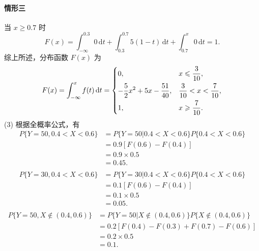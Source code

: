 \begin{solution}
    \paragraph{情形三} 当 $x \geqslant 0.7$ 时
    $$
        F(x) = \int_{-\infty}^{0.3}0\,\mathrm{d}t + \int_{0.3}^{0.7}5(1-t)\,\mathrm{d}t + \int_{0.7}^{x} 0\,\mathrm{d}t = 1.
    $$
    综上所述，分布函数 $F(x)$ 为
    $$
        F(x) = \int_{-\infty}^x f(t) \,\mathrm{d}t
        = \begin{dcases}
            0,                                    & x \leqslant \frac{3}{10},    \\
            -\frac{5}{2}x^2 + 5x - \frac{51}{40}, & \frac{3}{10}<x<\frac{7}{10}, \\
            1,                                    & x \geqslant \frac{7}{10}.
        \end{dcases}
    $$
    (3) 根据全概率公式，有
    $$
        \begin{aligned}
            P\{Y=50 , 0.4<X<0.6\}
             & = P\{Y=50 | 0.4<X<0.6\}P\{0.4<X<0.6\} \\
             & = 0.9 [F(0.6)-F(0.4)]                 \\
             & = 0.9 \times 0.5                      \\
             & = 0.45.                               \\
        \end{aligned}
    $$
    $$
        \begin{aligned}
            P\{Y=30 , 0.4<X<0.6\}
             & = P\{Y=30 | 0.4<X<0.6\}P\{0.4<X<0.6\} \\
             & = 0.1 [F(0.6)-F(0.4)]                 \\
             & = 0.1 \times 0.5                      \\
             & = 0.05.                               \\
        \end{aligned}
    $$
    $$
        \begin{aligned}
            P\{Y=50 , X \notin (0.4,0.6)\}
             & = P\{Y=50 |  X \notin (0.4,0.6)\}P\{X \notin (0.4,0.6)\} \\
             & = 0.2 [F(0.4)-F(0.3) + F(0.7)-F(0.6)]                    \\
             & = 0.2 \times 0.5                                         \\
             & = 0.1.                                                   \\

\end{aligned}$$
\end{solution}
